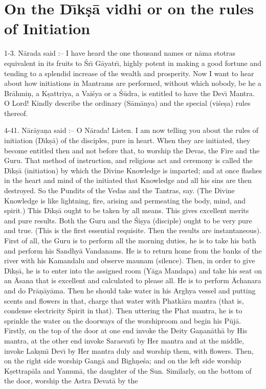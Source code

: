 \chapter{On the D\={\i}k\d{s}\=a vidhi or on the rules of Initiation}

1-3. N\=arada said :-- I have heard the one thousand names or n\=ama stotras equivalent in its fruits to \'Sr\={\i} G\=ayatr\={\i}, highly potent in making a good fortune and tending to a splendid increase of the wealth and prosperity. Now I want to hear about how initiations in Mantrams are performed, without which nobody, be he a Br\=ahmi\d{n}, a K\d{s}attriya, a Vai\'sya or a \'S\=udra, is entitled to have the Dev\={\i} Mantra. O Lord! Kindly describe the ordinary (S\=am\=anya) and the special (vi\'se\d{s}a) rules thereof.

4-41. N\=ar\=aya\d{n}a said :-- O N\=arada! Listen. I am now telling you about the rules of initiation (D\={\i}k\d{s}\=a) of the disciples, pure in heart. When they are initiated, they become entitled then and not before that, to worship the Devas, the Fire and the Guru. That method of instruction, and religious act and ceremony is called the D\={\i}k\d{s}\=a (initiation) by which the Divine Knowledge is imparted; and at once flashes in the heart and mind of the initiated that Knowledge and all his sins are then destroyed. So the Pundits of the Vedas and the Tantras, say. (The Divine Knowledge is like lightning, fire, arising and permeating the body, mind, and spirit.) This D\={\i}k\d{s}\=a ought to be taken by all means. This gives excellent merits and pure results. Both the Guru and the \'Si\d{s}ya (disciple) ought to be very pure and true. (This is the first essential requisite. Then the results are instantaneous). First of all, the Guru is to perform all the morning duties, he is to take his bath and perform his Sandhy\=a Vandanams. He is to return home from the banks of the river with his Kamandalu and observe maunam (silence). Then, in order to give D\={\i}k\d{s}\=a, he is to enter into the assigned room (Y\=aga Mandapa) and take his seat on an \=Asana that is excellent and calculated to please all. He is to perform \=Achanara and do Pr\=a\d{n}\=ay\=ama. Then he should take water in his Arghya vessel and putting scents and flowers in that, charge that water with Phatk\=ara mantra (that is, condense electricity Spirit in that). Then uttering the Phat mantra, he is to sprinkle the water on the doorways of the worshiproom and begin his P\=uj\=a. Firstly, on the top of the door at one end invoke the Deity Ga\d{n}an\=ath\=a by His mantra, at the other end invoke Sarasvat\={\i} by Her mantra and at the middle, invoke Lak\d{s}m\={\i} Dev\={\i} by Her mantra duly and worship them, with flowers. Then, on the right side worship Gang\=a and Bigh\d{n}e\'sa; and on the left side worship K\d{s}ettrap\=ala and Yamun\=a, the daughter of the Sun. Similarly, on the bottom of the door, worship the Astra Devat\=a by the

